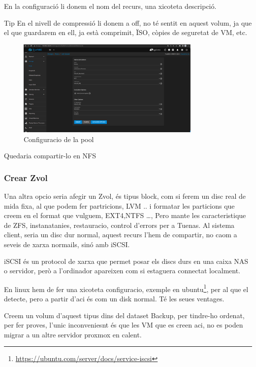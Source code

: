 \documentclass[
  10pt,
]{krantz}
\DeclareRobustCommand{\href}[2]{#2\footnote{\url{#1}}}
\begin{document}
En la configuració li donem el nom del recurs, una xicoteta descripció.

\begin{rmdtip}{Tip}
En el nivell de compressió li donem a off, no té sentit en aquest volum, ja que el que guardarem en ell, ja està comprimit, ÏSO, còpies de seguretat de VM, etc.

\end{rmdtip}

\begin{figure}
\centering
\includegraphics[width=0.8\textwidth,height=\textheight]{imatges/proxmox/Pool_backup2.png}
\caption{Configuracio de la pool}
\end{figure}

Quedaria compartir-lo en NFS

\hypertarget{crear-zvol}{%
\subsubsection{Crear Zvol}\label{crear-zvol}}

Una altra opcio seria afegir un Zvol, és tipus block, com si ferem un disc real de mida fixa, al que podem fer partricions, LVM .. i formatar les particions que creem en el format que vulguem, EXT4,NTFS \ldots, Pero mante les caracteristique de ZFS, instanatanies, restauracio, control d'errors per a Tuenas. Al sistema client, seria un disc dur normal, aquest recurs l'hem de compartir, no caom a seveis de xarxa normails, sinó amb iSCSI.

iSCSI és un protocol de xarxa que permet posar els discs durs en una caixa NAS o servidor, però a l'ordinador apareixen com si estaguera connectat localment.

En linux hem de fer una xicoteta configuracio, \href{https://ubuntu.com/server/docs/service-iscsi}{exemple en ubuntu}, per al que el detecte, pero a partir d'aci és com un disk normal. Té les seues ventages.

Creem un volum d'aquest tipus dins del dataset Backup, per tindre-ho ordenat, per fer proves, l'unic inconveniesnt és que les VM que es creen aci, no es poden migrar a un altre servidor proxmox en calent.
\end{document}
